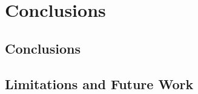 \chapter[Chapter Title]{\label{cha:Chapter8}Conclusions}

\section{\label{C8:Section1}Conclusions}

\section{\label{C8:Section2}Limitations and Future Work}




